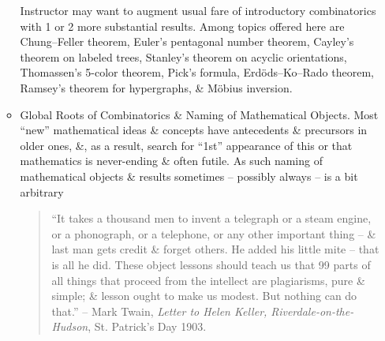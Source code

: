 \documentclass{article}
\begin{document}
\begin{itemize}
\begin{itemize}
		Instructor may want to augment usual fare of introductory combinatorics with 1 or 2 more substantial results. Among topics offered here are Chung--Feller theorem, Euler's pentagonal number theorem, Cayley's theorem on labeled trees, Stanley's theorem on acyclic orientations, Thomassen's 5-color theorem, Pick's formula, Erd\"ods--Ko--Rado theorem, Ramsey's theorem for hypergraphs, \& M\"obius inversion.
		\item {\sf Global Roots of Combinatorics \& Naming of Mathematical Objects.} Most ``new'' mathematical ideas \& concepts have antecedents \& precursors in older ones, \&, as a result, search for ``1st'' appearance of this or that mathematics is never-ending \& often futile. As such naming of mathematical objects \& results sometimes -- possibly always -- is a bit arbitrary
		\begin{quotation}
			``It takes a thousand men to invent a telegraph or a steam engine, or a phonograph, or a telephone, or any other important thing -- \& last man gets credit \& forget others. He added his little mite -- that is all he did. These object lessons should teach us that 99 parts of all things that proceed from the intellect are plagiarisms, pure \& simple; \& lesson ought to make us modest. But nothing can do that.'' -- {\sc Mark Twain}, {\it Letter to Helen Keller, Riverdale-on-the-Hudson}, St. Patrick's Day 1903.
			

\end{quotation}
\end{itemize}
\end{itemize}
\end{document}

